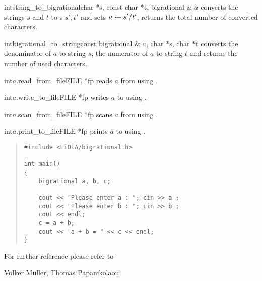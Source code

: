 \begin{fcode}{int}{string_to_bigrational}{char *s, const char *t, bigrational & $a$}
  converts the strings $s$ and $t$ to s $s', t'$ and sets $a \leftarrow s'/t'$, returns
  the total number of converted characters.
\end{fcode}

\begin{fcode}{int}{bigrational_to_string}{const bigrational & $a$, char *s, char *t}
  converts the denominator of $a$ to string $s$, the numerator of $a$ to string $t$ and returns
  the number of used characters.
\end{fcode}

\begin{fcode}{int}{$a$.read_from_file}{FILE *fp}
  reads $a$ from  using .
\end{fcode}

\begin{fcode}{int}{$a$.write_to_file}{FILE *fp}
  writes $a$ to  using .
\end{fcode}

\begin{fcode}{int}{$a$.scan_from_file}{FILE *fp}
  scans $a$ from  using .
\end{fcode}

\begin{fcode}{int}{$a$.print_to_file}{FILE *fp}
  prints $a$ to  using .
\end{fcode}



\SEEALSO




\EXAMPLES

\begin{quote}
\begin{verbatim}
#include <LiDIA/bigrational.h>

int main()
{
    bigrational a, b, c;

    cout << "Please enter a : "; cin >> a ;
    cout << "Please enter b : "; cin >> b ;
    cout << endl;
    c = a + b;
    cout << "a + b = " << c << endl;
}

\end{verbatim}
\end{quote}

For further reference please refer to 



\AUTHOR

Volker M\"uller, Thomas Papanikolaou
